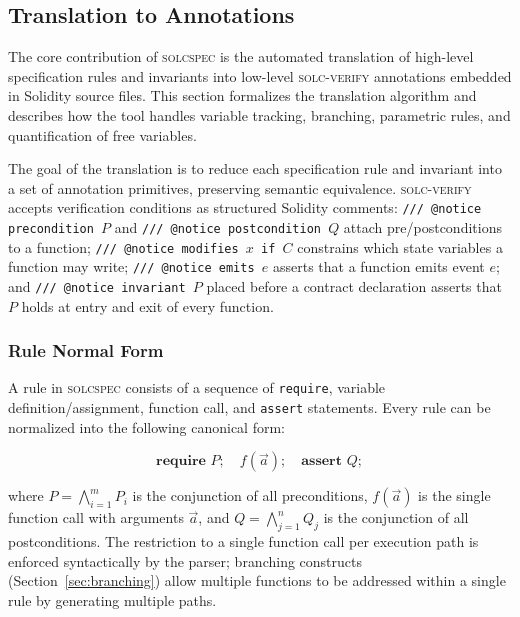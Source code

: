 \subsection{Translation to Annotations}
\label{sec:translation}

The core contribution of \textsc{solcspec} is the automated translation of high-level specification rules and invariants into low-level \textsc{solc-verify} annotations embedded in Solidity source files. This section formalizes the translation algorithm and describes how the tool handles variable tracking, branching, parametric rules, and quantification of free variables.

The goal of the translation is to reduce each specification rule and invariant into a set of annotation primitives, preserving semantic equivalence. \textsc{solc-verify} accepts verification conditions as structured Solidity comments: \texttt{/// @notice precondition~$P$} and \texttt{/// @notice postcondition~$Q$} attach pre/postconditions to a function; \texttt{/// @notice modifies~$x$~if~$C$} constrains which state variables a function may write; \texttt{/// @notice emits~$e$} asserts that a function emits event $e$; and \texttt{/// @notice invariant~$P$} placed before a contract declaration asserts that $P$ holds at entry and exit of every function.

\subsubsection{Rule Normal Form}

A rule in \textsc{solcspec} consists of a sequence of \texttt{require}, variable definition/assignment, function call, and \texttt{assert} statements. Every rule can be normalized into the following canonical form:

\begin{equation}
\label{eq:rule-normal-form}
\textbf{require } P;\quad f(\vec{a});\quad \textbf{assert } Q;
\end{equation}

\noindent where $P = \bigwedge_{i=1}^{m} P_i$ is the conjunction of all preconditions, $f(\vec{a})$ is the single function call with arguments $\vec{a}$, and $Q = \bigwedge_{j=1}^{n} Q_j$ is the conjunction of all postconditions. The restriction to a single function call per execution path is enforced syntactically by the parser; branching constructs (Section~\ref{sec:branching}) allow multiple functions to be addressed within a single rule by generating multiple paths.

